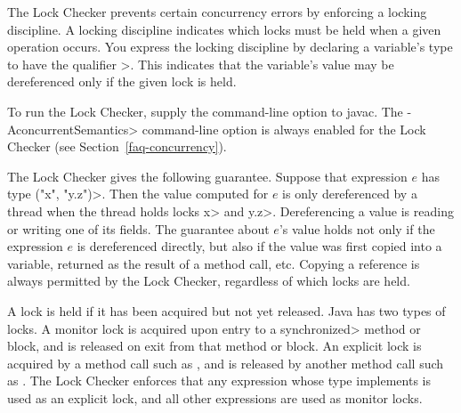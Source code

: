 \htmlhr
{}

The Lock Checker prevents certain concurrency errors by enforcing a
locking discipline.  A locking discipline indicates which locks must be held
when a given operation occurs.  You express the locking discipline by
declaring a variable's type to have the qualifier
\<>.
This indicates that the variable's value may
be dereferenced only if the given lock is held.


To run the Lock Checker, supply the
command-line option to javac.  The \<-AconcurrentSemantics>
command-line option is always enabled for the Lock Checker (see Section~\ref{faq-concurrency}).



The Lock Checker gives the following guarantee.
Suppose that expression $e$ has type
\<(\ttlcb"x", "y.z"\ttrcb)>.
Then the value computed for $e$ is only dereferenced by a thread when the
thread holds locks \<x> and \<y.z>.
Dereferencing a value is reading or writing one of its fields.
The guarantee about $e$'s value
holds not only if the expression $e$ is dereferenced
directly, but also if the value was first copied into a variable,
returned as the
result of a method call, etc.
Copying a reference is always
permitted by the Lock Checker, regardless of which locks are held.

A lock is held if it has been acquired but not yet released.
Java has two types of locks.
A monitor lock is acquired upon entry to a \<synchronized> method or block,
and is released on exit from that method or block.
An explicit lock is acquired by a method call such as
,
and is released by another method call such as
.
The Lock Checker enforces that any expression whose type implements
 is used as an
explicit lock, and all other expressions are used as monitor locks.


